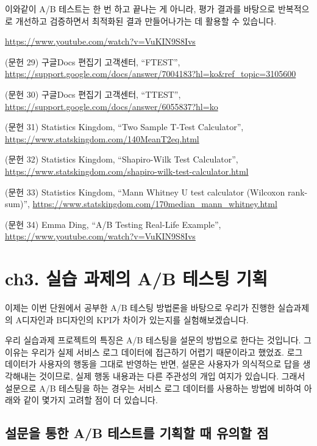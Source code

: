 \documentclass[
  letterpaper,
]{book}
\begin{document}
이와같이 A/B 테스트는 한 번 하고 끝나는 게 아니라, 평가 결과를 바탕으로
반복적으로 개선하고 검증하면서 최적화된 결과 만들어나가는 데 활용할 수
있습니다.

\url{https://www.youtube.com/watch?v=VuKIN9S8Ivs}

(문헌 29) 구글Docs 편집기 고객센터, ``FTEST'',
\url{https://support.google.com/docs/answer/7004183?hl=ko&ref_topic=3105600}

(문헌 30) 구글Docs 편집기 고객센터, ``TTEST'',
\url{https://support.google.com/docs/answer/6055837?hl=ko}

(문헌 31) Statistics Kingdom, ``Two Sample T-Test Calculator'',
\url{https://www.statskingdom.com/140MeanT2eq.html}

(문헌 32) Statistics Kingdom, ``Shapiro-Wilk Test Calculator'',
\url{https://www.statskingdom.com/shapiro-wilk-test-calculator.html}

(문헌 33) Statistics Kingdom, ``Mann Whitney U test calculator (Wilcoxon
rank-sum)'',
\url{https://www.statskingdom.com/170median_mann_whitney.html}

(문헌 34) Emma Ding, ``A/B Testing Real-Life Example'',
\url{https://www.youtube.com/watch?v=VuKIN9S8Ivs}

\chapter{ch3. 실습 과제의 A/B 테스팅
기획}\label{ch3.-uxc2e4uxc2b5-uxacfcuxc81cuxc758-ab-uxd14cuxc2a4uxd305-uxae30uxd68d}

이제는 이번 단원에서 공부한 A/B 테스팅 방법론을 바탕으로 우리가 진행한
실습과제의 A디자인과 B디자인의 KPI가 차이가 있는지를 실험해보겠습니다.

우리 실습과제 프로젝트의 특징은 A/B 테스팅을 설문의 방법으로 한다는
것입니다. 그 이유는 우리가 실제 서비스 로그 데이터에 접근하기 어렵기
때문이라고 했었죠. 로그 데이터가 사용자의 행동을 그대로 반영하는 반면,
설문은 사용자가 의식적으로 답을 생각해내는 것이므로, 실제 행동 내용과는
다른 주관성의 개입 여지가 있습니다. 그래서 설문으로 A/B 테스팅을 하는
경우는 서비스 로그 데이터를 사용하는 방법에 비하여 아래와 같이 몇가지
고려할 점이 더 있습니다.

\section{설문을 통한 A/B 테스트를 기획할 때 유의할
점}\label{uxc124uxbb38uxc744-uxd1b5uxd55c-ab-uxd14cuxc2a4uxd2b8uxb97c-uxae30uxd68duxd560-uxb54c-uxc720uxc758uxd560-uxc810}
\end{document}
